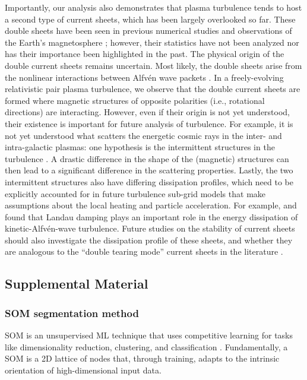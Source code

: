 Importantly, our analysis also demonstrates that plasma turbulence tends to host a second type of current sheets, which has been largely overlooked so far.
These double sheets have been seen in previous numerical studies \citep[e.g.,][]{servidio_magnetic_2009, zhou_spectrum_2023} and observations of the Earth's magnetosphere \citep[e.g.,][]{ergun_observations_2009}; however, their statistics have not been analyzed nor has their importance been highlighted in the past.
The physical origin of the double current sheets remains uncertain.
Most likely, the double sheets arise from the nonlinear interactions between Alfv\'en wave packets \citep{howes_alfven_2013,howes_dynamical_2016,verniero_nonlinear_2018}.
In a freely-evolving relativistic pair plasma turbulence, we observe that the double current sheets are formed where magnetic structures of opposite polarities (i.e., rotational directions) are interacting.
However, even if their origin is not yet understood, their existence is important for future analysis of turbulence.
For example, it is not yet understood what scatters the energetic cosmic rays in the inter- and intra-galactic plasmas:
one hypothesis is the intermittent structures in the turbulence \citep{kempski_cosmic_2023,lemoine_particle_2023}.
A drastic difference in the shape of the (magnetic) structures can then lead to a significant difference in the scattering properties.
Lastly, the two intermittent structures also have differing dissipation profiles, which need to be explicitly accounted for in future turbulence sub-grid models that make assumptions about the local heating and particle acceleration.
For example, \citet{howes_spatially_2018} and \citet{nattila_heating_2022} found that Landau damping plays an important role in the energy dissipation of kinetic-Alfv\'en-wave turbulence.
Future studies on the stability of current sheets should also investigate the dissipation profile of these sheets, and whether they are analogous to the ``double tearing mode'' current sheets in the literature \citep[e.g.,][]{pritchett_linear_1980,baty_explosive_2013}.

\subsection{Supplemental Material}

\subsubsection{SOM segmentation method} \label{app:som}
SOM is an unsupervised ML technique that uses competitive learning for tasks like dimensionality reduction, clustering, and classification \citep{kohonen_self-organizing_1990}.
Fundamentally, a SOM is a 2D lattice of nodes that, through training, adapts to the intrinsic orientation of high-dimensional input data.

